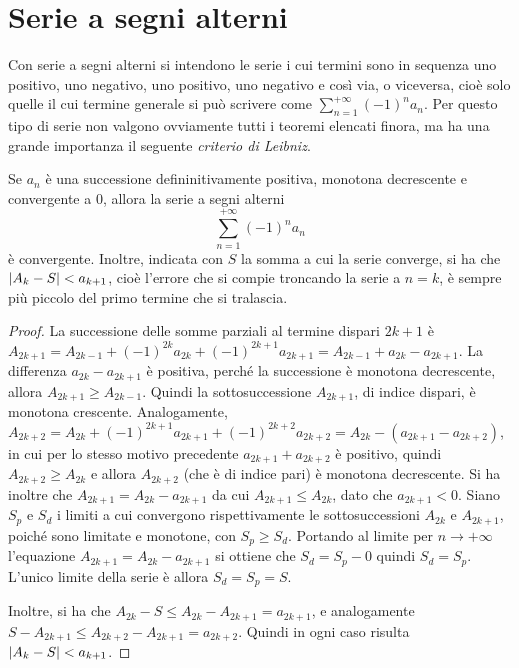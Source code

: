 \section{Serie a segni alterni}
Con serie a segni alterni si intendono le serie i cui termini sono in sequenza uno positivo, uno negativo, uno positivo, uno negativo e così via, o viceversa, cioè solo quelle il cui termine generale si può scrivere come $\sum_{n=1}^{+\infty}(-1)^na_n$. Per questo tipo di serie non valgono ovviamente tutti i teoremi elencati finora, ma ha una grande importanza il seguente \emph{criterio di Leibniz}.
\begin{teorema}[Leibniz]
\label{t:criterio_leibnitz}
Se $a_n$ è una successione defininitivamente positiva, monotona decrescente e convergente a 0, allora la serie a segni alterni
\[
\sum_{n=1}^{+\infty}(-1)^n a_n
\]
è convergente. Inoltre, indicata con $S$ la somma a cui la serie converge, si ha che $\lvert A_k-S\rvert<a_{k+1}$, cioè l'errore che si compie troncando la serie a $n=k$, è sempre più piccolo del primo termine che si tralascia.
\end{teorema}
\begin{proof}
La successione delle somme parziali al termine dispari $2k+1$ è $A_{2k+1}=A_{2k-1}+(-1)^{2k}a_{2k}+(-1)^{2k+1}a_{2k+1}=A_{2k-1}+a_{2k}-a_{2k+1}$. La differenza $a_{2k}-a_{2k+1}$ è positiva, perché la successione è monotona decrescente, allora $A_{2k+1}\geq A_{2k-1}$. Quindi la sottosuccessione $A_{2k+1}$, di indice dispari, è monotona crescente. Analogamente, $A_{2k+2}=A_{2k}+(-1)^{2k+1}a_{2k+1}+(-1)^{2k+2}a_{2k+2}=A_{2k}-(a_{2k+1}-a_{2k+2})$, in cui per lo stesso motivo precedente $a_{2k+1}+a_{2k+2}$ è positivo, quindi $A_{2k+2}\geq A_{2k}$ e allora $A_{2k+2}$ (che è di indice pari) è monotona decrescente.
Si ha inoltre che $A_{2k+1}=A_{2k}-a_{2k+1}$ da cui $A_{2k+1}\leq A_{2k}$, dato che $a_{2k+1}<0$. Siano $S_p$ e $S_d$ i limiti a cui convergono rispettivamente le sottosuccessioni $A_{2k}$ e $A_{2k+1}$, poiché sono limitate e monotone, con $S_p\geq S_d$. Portando al limite per $n\to+\infty$ l'equazione $A_{2k+1}=A_{2k}-a_{2k+1}$ si ottiene che $S_d=S_p-0$ quindi $S_d=S_p$. L'unico limite della serie è allora $S_d=S_p=S$.

Inoltre, si ha che $A_{2k}-S\leq A_{2k}-A_{2k+1}=a_{2k+1}$, e analogamente $S-A_{2k+1}\leq A_{2k+2}-A_{2k+1}=a_{2k+2}$. Quindi in ogni caso risulta $\lvert A_k-S\rvert<a_{k+1}$.
\end{proof}

